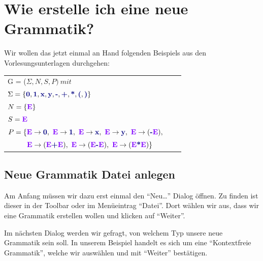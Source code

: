 

\chapter{Wie erstelle ich eine neue Grammatik?}\label{Grammar}

Wir wollen das jetzt einmal an Hand folgenden Beispiels aus den
Vorlesungsunterlagen durchgehen:\vspace{10pt}


\begin{tabular}{lcr}
G = ($\Sigma, N, S, P )\ mit $\\
$\Sigma = \{\TerminalSymbol{0}, \TerminalSymbol{1}, \TerminalSymbol{x},
\TerminalSymbol{y}, \TerminalSymbol{-}, \TerminalSymbol{+},
\TerminalSymbol{*}, \TerminalSymbol{(}, \TerminalSymbol{)}\}$\\ $N =
\{\StartSymbol{E}\}$\\ $S=\StartSymbol{E}$\\
$P = \{\StartSymbol{E} \to \TerminalSymbol{0},\ \StartSymbol{E} \to \TerminalSymbol{1},\
\StartSymbol{E}	\to \TerminalSymbol{x},\ \StartSymbol{E} \to \TerminalSymbol{y},\
\StartSymbol{E} \to (\TerminalSymbol{-}\StartSymbol{E}),$\\
$\ \ \ \ \ \ \ \ \StartSymbol{E} \to (\StartSymbol{E} \TerminalSymbol{+}
\StartSymbol{E}),\ \StartSymbol{E} \to (\StartSymbol{E} \TerminalSymbol{-} \StartSymbol{E}),\
\StartSymbol{E} \to (\StartSymbol{E} \TerminalSymbol{*} \StartSymbol{E})\}$\\
\end{tabular}

\section{Neue Grammatik Datei anlegen}

Am Anfang müssen wir dazu erst einmal den "`Neu\ldots"' Dialog öffnen. Zu finden
ist dieser in der Toolbar oder im Menüeintrag "`Datei"'. Dort wählen wir aus,
dass wir eine Grammatik erstellen wollen und klicken auf "`Weiter"'.\vspace{10pt}

Im nächsten Dialog werden wir gefragt, von welchem Typ unsere neue Grammatik
sein soll. In unserem Beispiel handelt es sich um eine "`Kontextfreie
Grammatik"', welche wir auswählen und mit "`Weiter"' bestätigen.\vspace{10pt}


